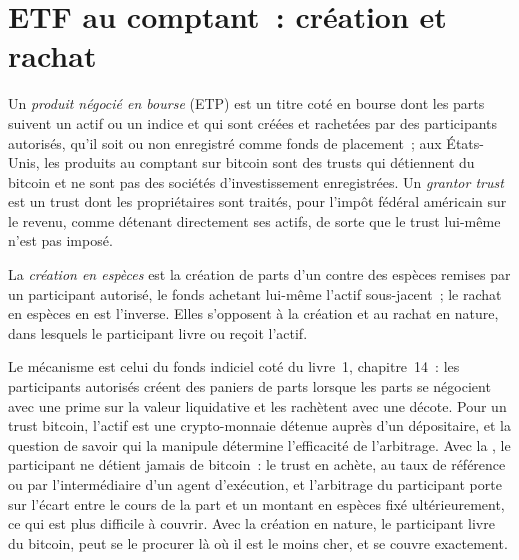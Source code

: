 \section{ETF au comptant~: création et rachat}

\begin{definition}\label{def:m3:dated-futures-options-and-etfs:etp}
Un \emph{produit négocié en bourse} (ETP) est un titre coté en bourse dont les parts suivent un actif ou un indice
et qui sont créées et rachetées par des participants autorisés, qu'il soit ou non enregistré comme fonds de placement~; aux États-Unis,
les produits au comptant sur bitcoin sont des trusts qui détiennent du bitcoin et ne sont pas des sociétés d'investissement enregistrées. Un \emph{grantor
trust} est un trust dont les propriétaires sont traités, pour l'impôt fédéral américain sur le revenu, comme détenant directement ses actifs, de sorte que le
trust lui-même n'est pas imposé.
\end{definition}

\begin{definition}\label{def:m3:dated-futures-options-and-etfs:cash}
La \emph{création en espèces} est la création de parts d'un  contre des espèces remises par un
participant autorisé, le fonds achetant lui-même l'actif sous-jacent~; le rachat en espèces en est l'inverse. Elles s'opposent à la
création et au rachat en nature, dans lesquels le participant livre ou reçoit l'actif.
\end{definition}

Le mécanisme est celui du fonds indiciel coté du livre~1, chapitre~14~: les participants autorisés créent des paniers de parts lorsque
les parts se négocient avec une prime sur la valeur liquidative et les rachètent avec une décote. Pour un trust bitcoin, l'actif est une crypto-monnaie détenue auprès
d'un dépositaire, et la question de savoir qui la manipule détermine l'efficacité de l'arbitrage. Avec la , le participant ne
détient jamais de bitcoin~: le trust en achète, au taux de référence ou par l'intermédiaire d'un agent d'exécution, et l'arbitrage du participant porte sur l'écart entre le cours de la
part et un montant en espèces fixé ultérieurement, ce qui est plus difficile à couvrir. Avec la création en nature, le participant livre du bitcoin, peut
se le procurer là où il est le moins cher, et se couvre exactement.

